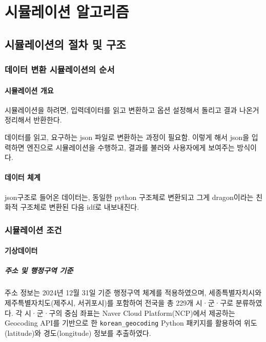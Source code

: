 \part{시뮬레이션 알고리즘}
\label{part:algorithm}


\chapter{시뮬레이션의 절차 및 구조}

\section{데이터 변환 시뮬레이션의 순서}

\subsection{시뮬레이션 개요}
시뮬레이션을 하려면, 입력데이터를 읽고 변환하고 옵션 설정해서 \ep 돌리고 결과 나온거 정리해서 반환한다.

데이터를 읽고, 요구하는 json 파일로 변환하는 과정이 필요함. 이렇게 해서 json을 입력하면 \simulator 엔진으로 시뮬레이션을 수행하고, 결과를 불러와 사용자에게 보여주는 방식이다.

\subsection{데이터 체계}
json구조로 들어온 데이터는, 동일한 python 구조체로 변환되고 그게 dragon이라는 \ep 친화적 구조체로 변환된 다음 idf로 내보내진다.


\section{시뮬레이션 조건}
\subsection{기상데이터}
\subsubsection{주소 및 행정구역 기준}
주소 정보는 2024년 12월 31일 기준 행정구역 체계를 적용하였으며, 세종특별자치시와 제주특별자치도(제주시, 서귀포시)를 포함하여 전국을 총 229개 시·군·구로 분류하였다.
각 시·군·구의 중심 좌표는 Naver Cloud Platform(NCP)에서 제공하는 Geocoding API를 기반으로 한 \texttt{korean\_geocoding} Python 패키지를 활용하여 위도(latitude)와 경도(longitude) 정보를 추출하였다.

